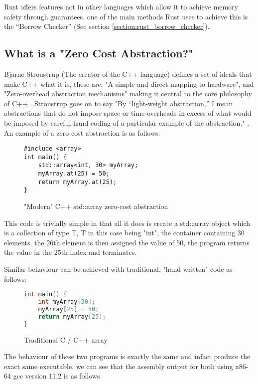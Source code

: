 \documentclass{article}
\begin{document}
Rust offers features not in other languages which allow it to achieve memory safety through guarantees, one of the main methods Rust uses to achieve this is the ``Borrow Checker'' (See section \ref{section:rust_borrow_checker}).
\subsection{What is a "Zero Cost Abstraction?"}
Bjarne Stroustrup (The creator of the C++ language) defines a set of ideals that make C++ what it is, these are: "A simple and direct mapping to hardware", and "Zero-overhead abstraction mechanisms" making it central to the core philosophy of C++ \parencite{stroustrup-presentation}. Stroustrup goes on to say "By “light-weight abstraction,” I mean abstractions that do not impose space or time overheads in excess of what would be imposed by careful hand coding of a particular example of the abstraction." \parencite{stroustrup-presentation}. An example of a zero cost abstraction is as follows:

\begin{figure}[H]
	\begin{lstlisting}
#include <array>
int main() {
    std::array<int, 30> myArray;
    myArray.at(25) = 50;
    return myArray.at(25);
}
				\end{lstlisting}
	\caption{"Modern" C++ std::array zero-cost abstraction}
\label{figure:c++_zero_cost_abstraction}
\end{figure}

This code is trivially simple in that all it does is create a std::array object which is a collection of type T, T in this case being "int", the container containing 30 elements. the 26th element is then assigned the value of 50, the program returns the value in the 25th index and terminates.

Similar behaviour can be achieved with traditional, "hand written" code as follows:
\begin{figure}[H]
	\begin{lstlisting}[language=c++]
int main() {
    int myArray[30];
    myArray[25] = 50;
    return myArray[25];
}
				\end{lstlisting}
	\caption{Traditional C / C++ array}
\label{figure:c++_traditional_array}
\end{figure}
The behaviour of these two programs is exactly the same and infact produce the exact same executable, we can see that the assembly output for both using x86-64 gcc version 11.2 is as follows
\end{document}
